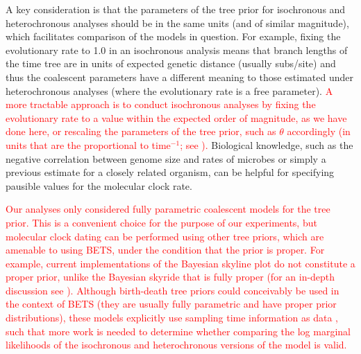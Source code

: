 \documentclass[10pt,letterpaper]{article}
\begin{document}
A key consideration is that the parameters of the tree prior for isochronous and heterochronous analyses should be in the same units (and of similar magnitude), which facilitates comparison of the models in question. For example, fixing the evolutionary rate to 1.0 in an isochronous analysis means that branch lengths of the time tree are in units of expected genetic distance (usually subs/site) and thus the coalescent parameters have a different meaning to those estimated under heterochronous analyses (where the evolutionary rate is a free parameter). \textcolor{red}{A more tractable approach is to conduct isochronous analyses by fixing the evolutionary rate to a value within the expected order of magnitude, as we have done here, or rescaling the parameters of the tree prior, such as $\theta$ accordingly (in units that are the proportional to time$^{-1}$; see \cite{boskova2014inference}).} Biological knowledge, such as the negative correlation between genome size and rates of microbes \cite{sanjuan2012molecular, duchene2016genome} or simply a previous estimate for a closely related organism, can be helpful for specifying pausible values for the molecular clock rate.

\textcolor{red}{Our analyses only considered fully parametric coalescent models for the tree prior. This is a convenient choice for the purpose of our experiments, but molecular clock dating can be performed using other tree priors, which are amenable to using BETS, under the condition that the prior is proper. For example, current implementations of the Bayesian skyline plot do not constitute a proper prior, unlike the Bayesian skyride that is fully proper (for an in-depth discussion see \cite{baele2014bayesian}). Although birth-death tree priors could conceivably be used in the context of BETS (they are usually fully parametric and have proper prior distributions), these models explicitly use sampling time information as data \cite{boskova2018influence}, such that more work is needed to determine whether comparing the log marginal likelihoods of the isochronous and heterochronous versions of the model is valid.}
\end{document}
